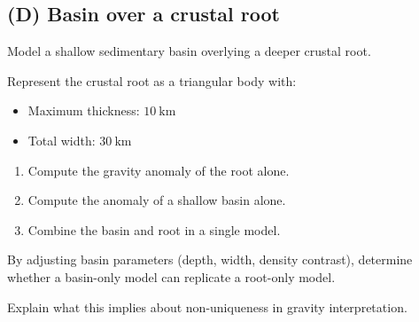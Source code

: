 \documentclass[11pt,a4paper,final]{article}
\begin{document}
\subsection*{(D) Basin over a crustal root}

Model a shallow sedimentary basin overlying a deeper crustal root.
\begin{figure}[h!]
    \begin{center}
    \end{center}
\end{figure}
Represent the crustal root as a triangular body with:

\begin{itemize}
\item Maximum thickness: $10~\mathrm{km}$
\item Total width: $30~\mathrm{km}$
\end{itemize}

\begin{enumerate}
\item Compute the gravity anomaly of the root alone.
\item Compute the anomaly of a shallow basin alone.
\item Combine the basin and root in a single model.
\end{enumerate}

By adjusting basin parameters (depth, width, density contrast),
determine whether a basin-only model can replicate a root-only model.

Explain what this implies about non-uniqueness in gravity interpretation.

\end{document}
